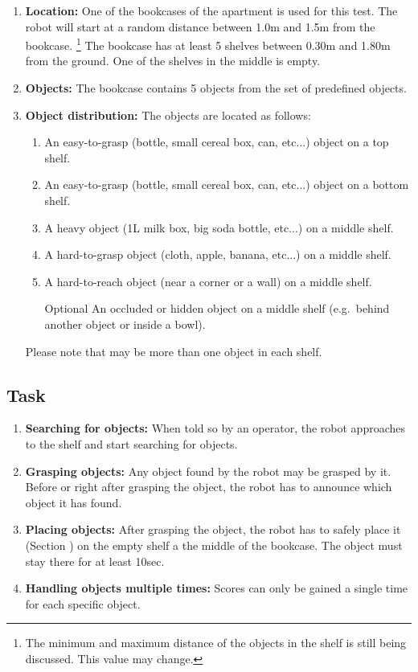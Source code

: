 \begin{enumerate}
\item \textbf{Location:} One of the bookcases of the apartment is used for this test. The robot will start at a random distance between 1.0m and 1.5m from the bookcase.
\footnote{The minimum and maximum distance of the objects in the shelf is still being discussed. This value may change.}
The bookcase has at least 5 shelves between 0.30m and 1.80m from the ground. One of the shelves in the middle is empty.
\item \textbf{Objects:} The bookcase contains 5 objects from the set of predefined objects.
\item \textbf{Object distribution:} The objects are located as follows:
\begin{enumerate}
\item An easy-to-grasp (bottle, small cereal box, can, etc...) object on a top shelf.
\item An easy-to-grasp (bottle, small cereal box, can, etc...) object on a bottom shelf.
\item A heavy object (1L milk box, big soda bottle, etc...) on a middle shelf.
\item A hard-to-grasp object (cloth, apple, banana, etc...) on a middle shelf.
\item A hard-to-reach object (near a corner or a wall) on a middle shelf.
\item[Optional] An occluded or hidden object on a middle shelf (e.g.~behind another object or inside a bowl).
\end{enumerate}
Please note that may be more than one object in each shelf.
\end{enumerate}

\subsection{Task}
\begin{enumerate}
\item \textbf{Searching for objects:} When told so by an operator, the robot approaches to the shelf and start searching for objects.
\item \textbf{Grasping objects:} Any object found by the robot may be grasped by it. Before or right after grasping the object, the robot has to announce which object it has found.
\item \textbf{Placing objects:} After grasping the object, the robot has to safely place it (Section ) on the empty shelf a the middle of the bookcase. The object must stay there for at least 10sec.
\item \textbf{Handling objects multiple times:} Scores can only be gained a single time for each specific object.
\end{enumerate}

